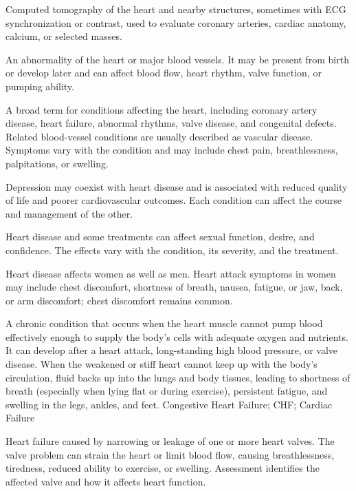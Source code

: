 Computed tomography of the heart and nearby structures, sometimes with ECG synchronization or contrast, used to evaluate coronary arteries, cardiac anatomy, calcium, or selected masses.

 An abnormality of the heart or major blood vessels. It may be present from birth or develop later and can affect blood flow, heart rhythm, valve function, or pumping ability.

 A broad term for conditions affecting the heart, including coronary artery disease, heart failure, abnormal rhythms, valve disease, and congenital defects. Related blood-vessel conditions are usually described as vascular disease. Symptoms vary with the condition and may include chest pain, breathlessness, palpitations, or swelling.

 Depression may coexist with heart disease and is associated with reduced quality of life and poorer cardiovascular outcomes. Each condition can affect the course and management of the other.

 Heart disease and some treatments can affect sexual function, desire, and confidence. The effects vary with the condition, its severity, and the treatment.

 Heart disease affects women as well as men. Heart attack symptoms in women may include chest discomfort, shortness of breath, nausea, fatigue, or jaw, back, or arm discomfort; chest discomfort remains common.

 A chronic condition that occurs when the heart muscle cannot pump blood effectively enough to supply the body's cells with adequate oxygen and nutrients. It can develop after a heart attack, long-standing high blood pressure, or valve disease. When the weakened or stiff heart cannot keep up with the body's circulation, fluid backs up into the lungs and body tissues, leading to shortness of breath (especially when lying flat or during exercise), persistent fatigue, and swelling in the legs, ankles, and feet.
\synonyms
Congestive Heart Failure; CHF; Cardiac Failure

 Heart failure caused by narrowing or leakage of one or more heart valves. The valve problem can strain the heart or limit blood flow, causing breathlessness, tiredness, reduced ability to exercise, or swelling. Assessment identifies the affected valve and how it affects heart function.


